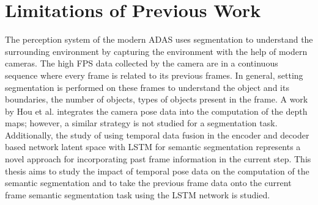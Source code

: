     \section{Limitations of Previous Work}
    
    The perception system of the modern ADAS uses segmentation to understand the surrounding environment by capturing the environment with the help of modern cameras. The high FPS data collected by the camera are in a continuous sequence where every frame is related to its previous frames. In general, setting segmentation is performed on these frames to understand the object and its boundaries, the number of objects, types of objects present in the frame. A work by Hou et al. \cite{52_hou2019multi} integrates the camera pose data into the computation of the depth maps; however, a similar strategy is not studied for a segmentation task. Additionally, the study of using temporal data fusion in the encoder and decoder based network latent space with LSTM for semantic segmentation represents a novel approach for incorporating past frame information in the current step. This thesis aims to study the impact of temporal pose data on the computation of the semantic segmentation and to take the previous frame data onto the current frame semantic segmentation task using the LSTM network is studied. 
    

